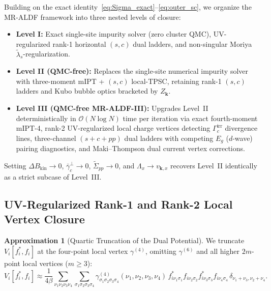 \documentclass[11pt,a4paper]{article}
\numberwithin{equation}{section}
\theoremstyle{plain}
\theoremstyle{definition}
\newtheorem{approximation}{Approximation}[section]
\providecommand{\vk}{\mathbf{k}}
\begin{document}
Building on the exact identity~\eqref{eq:Sigma_exact}--\eqref{eq:outer_sc}, we organize
the MR-ALDF framework into three nested levels of closure:
\begin{itemize}
    \item \textbf{Level I:} Exact single-site impurity solver (zero cluster QMC),
    UV-regularized rank-1 horizontal $(s,c)$ dual ladders, and non-singular Moriya
    $\tilde{\lambda}_s$-regularization.
    \item \textbf{Level II (QMC-free):} Replaces the single-site numerical impurity
    solver with three-moment mIPT + $(s,c)$ local-TPSC, retaining rank-1 $(s,c)$ ladders
    and Kubo bubble optics bracketed by $Z_{\vk}$.
    \item \textbf{Level III (QMC-free MR-ALDF-III):} Upgrades Level~II deterministically
    in $\mathcal{O}(N\log N)$ time per iteration via exact fourth-moment mIPT-4,
    rank-2 UV-regularized local charge vertices detecting $\Gamma_c^{\mathrm{irr}}$
    divergence lines, three-channel $(s+c+pp)$ dual ladders with competing $E_g$
    ($d$-wave) pairing diagnostics, and Maki--Thompson dual current vertex corrections.
\end{itemize}
Setting $\Delta B_{\mathrm{kin}} \to 0$, $\bar{\gamma}_c^{\perp} \to 0$,
$\tilde{\Sigma}_{pp} \to 0$, and $\Lambda_x \to v_{\vk,x}$ recovers Level~II
identically as a strict subcase of Level~III.

\subsection{UV-Regularized Rank-1 and Rank-2 Local Vertex Closure}
\label{sec:vertex_closure}

\begin{approximation}[Quartic Truncation of the Dual Potential]
We truncate $V_i[f^*_i,f_i]$ at the four-point local vertex $\gamma^{(4)}$, omitting
$\gamma^{(6)}$ and all higher $2m$-point local vertices ($m \ge 3$):
\begin{equation}
    V_i[f^*_i, f_i] \approx \frac{1}{4\beta}
    \sum_{\nu_1\nu_2\nu_3\nu_4} \sum_{\sigma_1\sigma_2\sigma_3\sigma_4}
    \gamma^{(4)}_{\sigma_1\sigma_2\sigma_3\sigma_4}(\nu_1,\nu_2,\nu_3,\nu_4)\,
    f^*_{i\nu_1\sigma_1} f_{i\nu_2\sigma_2} f^*_{i\nu_3\sigma_3} f_{i\nu_4\sigma_4}\,
    \delta_{\nu_1+\nu_3,\nu_2+\nu_4}.
    \label{eq:V4}
\end{equation}
\end{approximation}
\end{document}
